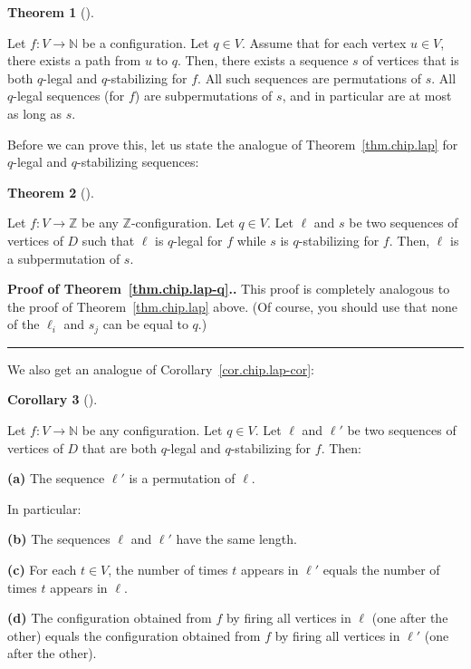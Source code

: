 \documentclass[numbers=enddot,12pt,final,onecolumn,notitlepage]{scrartcl}%
\theoremstyle{definition}
\newtheorem{theo}{Theorem}[section]
\newenvironment{theorem}[1][]
{\begin{theo}[#1]\begin{leftbar}}
{\end{leftbar}\end{theo}}
\newtheorem{coro}[theo]{Corollary}
\newenvironment{corollary}[1][]
{\begin{coro}[#1]\begin{leftbar}}
{\end{leftbar}\end{coro}}
\newenvironment{proof}[1][Proof]{\noindent\textbf{#1.} }{\ \rule{0.5em}{0.5em}}
\newcommand{\NN}{\mathbb{N}}
\newcommand{\ZZ}{\mathbb{Z}}
\begin{document}
\begin{theorem} \label{thm.chip.dichotomy-q}
Let $f : V \to \NN$ be a configuration.
Let $q \in V$.
Assume that for each vertex $u \in V$, there exists a path
from $u$ to $q$.
Then, there exists a sequence $s$ of vertices that is both
$q$-legal and $q$-stabilizing for $f$.
All such sequences are permutations of $s$.
All $q$-legal sequences (for $f$) are subpermutations
of $s$, and in particular are at most as long as $s$.
\end{theorem}

Before we can prove this, let us state the analogue of
Theorem~\ref{thm.chip.lap} for $q$-legal and
$q$-stabilizing sequences:

\begin{theorem} \label{thm.chip.lap-q}
Let $f : V \to \ZZ$ be any $\ZZ$-configuration.
Let $q \in V$.
Let $\ell$ and $s$ be two sequences of vertices of $D$ such
that $\ell$ is $q$-legal for $f$ while $s$ is
$q$-stabilizing for $f$.
Then, $\ell$ is a subpermutation of $s$.
\end{theorem}

\begin{proof}[Proof of Theorem~\ref{thm.chip.lap-q}.]
This proof is completely analogous to the proof
of Theorem~\ref{thm.chip.lap} above.
(Of course, you should use that none of the $\ell_i$
and $s_j$ can be equal to $q$.)
\end{proof}

We also get an analogue of Corollary~\ref{cor.chip.lap-cor}:

\begin{corollary} \label{cor.chip.lap-cor-q}
Let $f : V \to \NN$ be any configuration.
Let $q \in V$.
Let $\ell$ and $\ell'$ be two sequences of vertices of $D$
that are both $q$-legal and $q$-stabilizing for $f$.
Then:

\textbf{(a)} The sequence $\ell'$ is a permutation of $\ell$.

In particular:

\textbf{(b)} The sequences $\ell$ and $\ell'$ have the
same length.

\textbf{(c)} For each $t \in V$, the number of times $t$
appears in $\ell'$ equals the number of times $t$ appears in
$\ell$.

\textbf{(d)} The configuration obtained from $f$ by firing
all vertices in $\ell$ (one after the other) equals the
configuration obtained from $f$ by firing
all vertices in $\ell'$ (one after the other).
\end{corollary}
\end{document}
